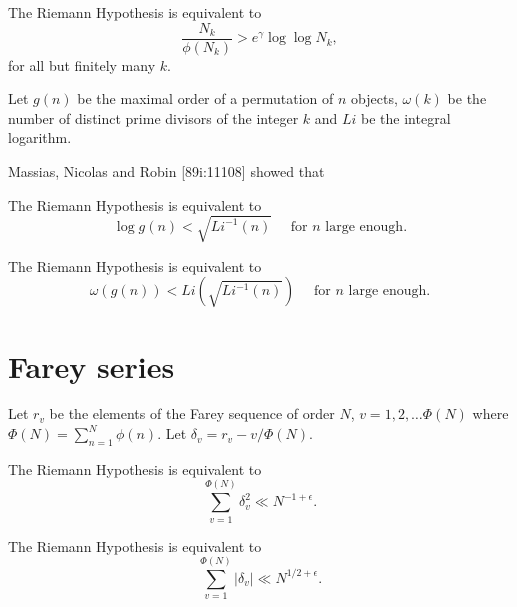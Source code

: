 \documentclass[12pt,letterpaper, reqno]{amsart}
\begin{document}
\begin{problemblock}
\begin{rhequivalence}[3.25]The Riemann Hypothesis is
equivalent to
$$
\frac{N_k}{\phi(N_k)} > e^{\gamma} \log \log N_k,
$$
for all but finitely many $k$.
\end{rhequivalence}
\end{problemblock}


\begin{problemblock}
Let $g(n)$ be the maximal order of a permutation of $n$ objects,
$\omega(k)$ be the number of distinct prime divisors of the integer $k$
and $Li$ be the integral logarithm.

Massias, Nicolas and Robin [89i:11108] showed that
\begin{rhequivalence}[3.3]The Riemann Hypothesis is
equivalent to
$$
\log g(n) < \sqrt{Li^{-1}(n)} \quad \text{ for $n$ large enough}.
$$
\end{rhequivalence}
\end{problemblock}

\begin{problemblock}
\begin{rhequivalence}[3.35]The Riemann Hypothesis is
equivalent to
$$
\omega(g(n)) < Li (\sqrt{Li^{-1}(n)}) \quad \text{ for $n$ large enough}.
$$
\end{rhequivalence}
\end{problemblock}


\section{Farey series}
 Let $r_v$ be the elements of the Farey sequence of order $N$, $v=1,2,\dots \Phi(N)$ where $\Phi(N)=\sum_{n=1}^N\phi(n)$.  Let $\delta_v=r_v-v/\Phi(N)$.


\begin{problemblock}
\begin{rhequivalence}[4.1]The Riemann Hypothesis is
equivalent to
$$\sum_{v=1}^{\Phi(N)} \delta_v^2\ll N^{-1+\epsilon}.$$
\end{rhequivalence}
\end{problemblock}

\begin{problemblock}
\begin{rhequivalence}[4.15]The Riemann Hypothesis is
equivalent to
$$\sum_{v=1}^{\Phi(N)} |\delta_v|\ll N^{1/2+\epsilon}.$$
\end{rhequivalence}
\end{problemblock}
\end{document}
